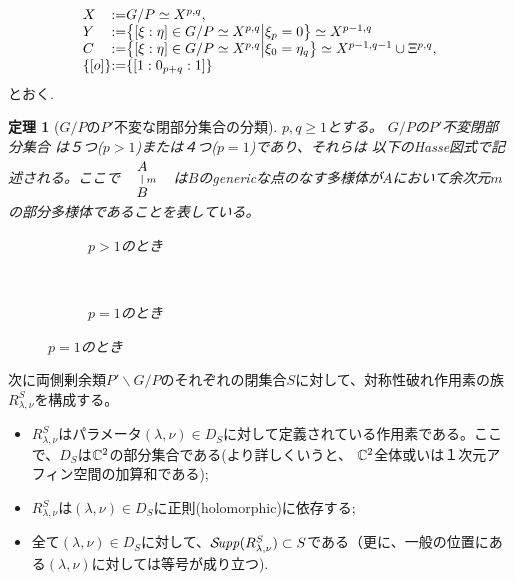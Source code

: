 \documentclass[12pt]{article} %
\newcommand{\Supp}{\mathcal{S}\!{\it upp}}
\newtheorem{theorem}{定理}
\theoremstyle{definition}
\theoremstyle{exampstyle} \newtheorem{examp}[theorem]{Theorem}
\begin{document}
\[\begin{array}{@{}l@{}l@{}l@{}}
X&:=&G/P\simeq X^{p,q},\\
Y&:=&\mysetn{[\xi:\eta]\in G/P\simeq X^{p,q}}{\xi_{p}=0}\simeq X^{p-1,q}\\
C&:=&\mysetn{[\xi:\eta]\in G/P\simeq X^{p,q}}{\xi_{0}=\eta_q}\simeq X^{p-1,q-1}\cup\Xi^{p,q},\\
\left\{ [o] \right\}&:=&\left\{ [1:0_{p+q}:1] \right\}
\end{array}\]
{とおく.}
\begin{theorem}[$G/P$の$P'$不変な閉部分集合の分類]
	$p,q\ge1$とする。
	$G/P$の$P'$不変閉部分集合
は５つ($p>1$){または}４つ($p=1$)であり、それらは
以下のHasse図式で記述される。ここで
	$
	\begin{array}{l}
	        \xymatrixrowsep{0.5pc}
		\xymatrix{A\ar@{-}[d]^m\\B}
	\end{array}
	$
	は$B$のgenericな点のなす多様体が$A$において余次元$m$の部分多様体であることを表している。\\
  \begin{figure}[H]
    \centering
    \begin{subfigure}[t]{0.3\textwidth}
	    \xymatrixrowsep{0.5pc}
	\caption{$p>1$のとき}
    \end{subfigure}
    ~ %
    \begin{subfigure}[t]{0.3\textwidth}
	    \xymatrixrowsep{0.5pc}
	    {}
	    \vspace{8pt}
	\caption{$p=1$のとき}
    \end{subfigure}
\end{figure}
\end{theorem}
次に両側剰余類$P'\backslash G/P$のそれぞれの閉集合$S$に対して、対称性破れ作用素の族$R^S_{\lambda,\nu}$を構成する。
\begin{itemize}
	\item $R_{\lambda,\nu}^S$はパラメータ$(\lambda,\nu)\in D_S$に対して定義されている作用素である。ここで、$D_S$は$\mathbb{C}^2$の部分集合である(より詳しくいうと、
		$\mathbb{C}^2$全体或いは１次元アフィン空間の加算和である);
	\item $R_{\lambda,\nu}^S$は$(\lambda,\nu)\in D_S$に正則(holomorphic)に依存する;
	\item 全て$(\lambda,\nu)\in D_S$に対して、$\Supp(R_{\lambda,\nu}^S)\subset S$である（更に、一般の位置に{ある}$(\lambda,\nu)$に対しては{等号}が成り立つ).
\end{itemize}
\end{document}

